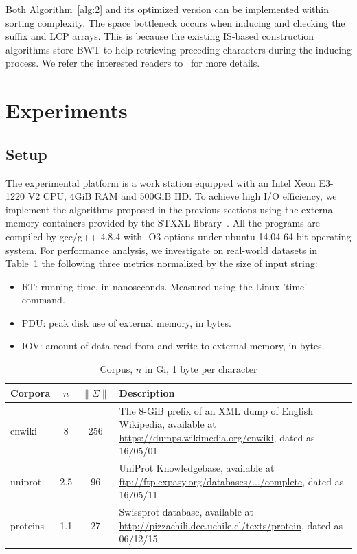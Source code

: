 \documentclass[10pt,journal,compsoc]{IEEEtran}
\begin{document}
Both Algorithm~\ref{alg:2} and its optimized version can be implemented within sorting complexity. The space bottleneck occurs when inducing and checking the suffix and LCP arrays. This is because the existing IS-based construction algorithms store BWT to help retrieving preceding characters during the inducing process. We refer the interested readers to~\cite{Karkkainen2013} for more details.

\section{Experiments} \label{sec:experiment}

\subsection{Setup} \label{sec:experiment:setup}

The experimental platform is a work station equipped with an Intel Xeon E3-1220 V2 CPU, 4GiB RAM and 500GiB HD. To achieve high I/O efficiency, we implement the algorithms proposed in the previous sections using the external-memory containers provided by the STXXL library~\cite{Dementiev2007}. All the programs are compiled by gcc/g++ 4.8.4 with -O3 options under ubuntu 14.04 64-bit operating system. For performance analysis, we investigate on real-world datasets in Table~\ref{tbl:1} the following three metrics normalized by the size of input string: 

\begin{itemize}
	
	\item RT: running time, in nanoseconds. Measured using the Linux 'time' command.
	
	\item PDU: peak disk use of external memory, in bytes.
	
	\item IOV: amount of data read from and write to external memory, in bytes.
	
\end{itemize}
	
\renewcommand\arraystretch{1.3}
\begin{table}[!t]
	\caption{Corpus, $n$ in Gi, 1 byte per character}
	\label{tbl:1}
	\centering
	\begin{tabular}{|l|c|c|p{10cm}|}
		\hline
		Corpora & \multicolumn{1}{c|}{$n$} & \multicolumn{1}{c|}{$\|\Sigma\|$} & Description \\\hline
		enwiki & 8 & 256 & The 8-GiB prefix of an XML dump of English Wikipedia, available at \url{https://dumps.wikimedia.org/enwiki}, dated as 16/05/01. \\\hline	
		uniprot & 2.5 & 96 & UniProt Knowledgebase, available at \url{ftp://ftp.expasy.org/databases/.../complete}, dated as 16/05/11. \\\hline
		proteins & 1.1 & 27 & Swissprot database, available at \url{http://pizzachili.dcc.uchile.cl/texts/protein}, dated as 06/12/15. \\\hline
	\end{tabular}
\end{table}
\end{document}
